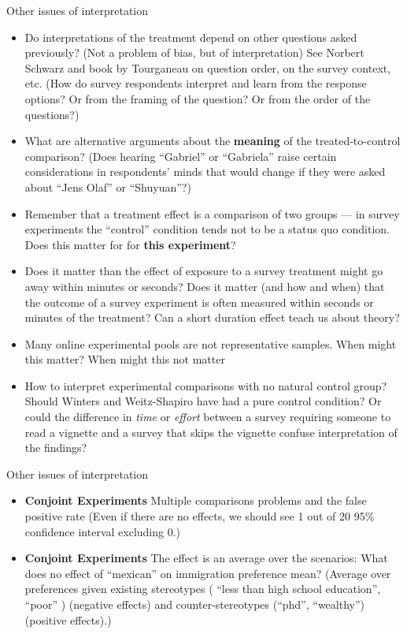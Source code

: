 \documentclass[
  ignorenonframetext,
]{beamer}
\providecommand{\tightlist}{%
  \setlength{\itemsep}{0pt}\setlength{\parskip}{0pt}}
\begin{document}
\begin{frame}[allowframebreaks]{Other issues of interpretation}
\protect\hypertarget{other-issues-of-interpretation}{}
\begin{itemize}
\tightlist
\item
  Do interpretations of the treatment depend on other questions asked
  previously? (Not a problem of bias, but of interpretation) See Norbert
  Schwarz and book by Tourganeau on question order, on the survey
  context, etc. (How do survey respondents interpret and learn from the
  response options? Or from the framing of the question? Or from the
  order of the questions?)
\item
  What are alternative arguments about the \textbf{meaning} of the
  treated-to-control comparison? (Does hearing ``Gabriel'' or
  ``Gabriela'' raise certain considerations in respondents' minds that
  would change if they were asked about ``Jens Olaf'' or ``Shuyuan''?)
\item
  Remember that a treatment effect is a comparison of two groups --- in
  survey experiments the ``control'' condition tends not to be a status
  quo condition. Does this matter for for \textbf{this experiment}?
\item
  Does it matter than the effect of exposure to a survey treatment might
  go away within minutes or seconds? Does it matter (and how and when)
  that the outcome of a survey experiment is often measured within
  seconds or minutes of the treatment? Can a short duration effect teach
  us about theory?
\item
  Many online experimental pools are not representative samples. When
  might this matter? When might this not matter
\item
  How to interpret experimental comparisons with no natural control
  group? Should Winters and Weitz-Shapiro have had a pure control
  condition? Or could the difference in \emph{time} or \emph{effort}
  between a survey requiring someone to read a vignette and a survey
  that skips the vignette confuse interpretation of the findings?
\end{itemize}
\end{frame}

\begin{frame}[allowframebreaks]{Other issues of interpretation}
\protect\hypertarget{other-issues-of-interpretation-1}{}
\begin{itemize}
\tightlist
\item
  \textbf{Conjoint Experiments} Multiple comparisons problems and the
  false positive rate (Even if there are no effects, we should see 1 out
  of 20 95\% confidence interval excluding 0.)
\item
  \textbf{Conjoint Experiments} The effect is an average over the
  scenarios: What does no effect of ``mexican'' on immigration
  preference mean? (Average over preferences given existing stereotypes
  ( ``less than high school education'', ``poor'' ) (negative effects)
  and counter-stereotypes (``phd'', ``wealthy'') (positive effects).)
\end{itemize}
\end{frame}
\end{document}
